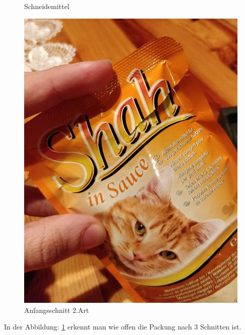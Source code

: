 \begin{figure}[H]
\begin{minipage}[hbt]{.3\linewidth}
      \caption{Schneidemittel}
      \label{Schneidemittel} 
   \end{minipage}
   \hspace{.4\linewidth}%
   \begin{minipage}[hbt]{.3\linewidth} %
      \includegraphics[width=\linewidth]{Bilder/Schneideversuch_2.Art/Anfangsschnitt}
      \caption{Anfangsschnitt 2.Art}
      \label{Nach 3 Schnitten}
   \end{minipage}
\end{figure}

In der Abbildung: \ref{Nach 3 Schnitten} erkennt man wie offen die Packung nach 3 Schnitten ist.

